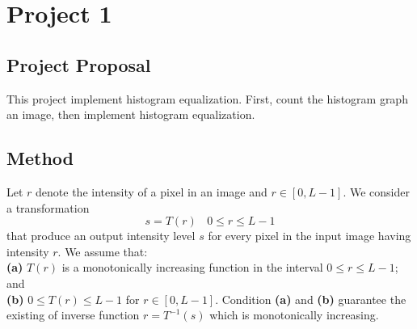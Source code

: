\section{Project 1}
\subsection{Project Proposal}
This project implement histogram equalization. First, count the histogram graph an image, then implement histogram equalization.
\subsection{Method}
Let $r$ denote the intensity of a pixel in an image and $r \in [0,L-1]$. We consider a transformation \begin{equation}s=T(r) ~~~~ 0 \leq r \leq L-1 \end{equation} that produce an output intensity level $s$ for every pixel in the input image having intensity $r$. We assume that:
\\ \textbf{(a)} $T(r)$ is a monotonically increasing function in the interval $0 \leq r \leq L-1$; and \\
\textbf{(b)} $0 \leq T(r) \leq L-1$ for $r \in [0, L-1]$.
Condition \textbf{(a)} and \textbf{(b)} guarantee the existing of inverse function $r=T^{-1}(s)$ which is monotonically increasing. 



